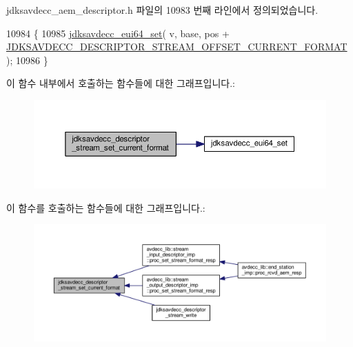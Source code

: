 jdksavdecc\+\_\+aem\+\_\+descriptor.\+h 파일의 10983 번째 라인에서 정의되었습니다.


\begin{DoxyCode}
10984 \{
10985     \hyperlink{group__eui64_ga1c5b342315464ff77cbc7d587765432d}{jdksavdecc\_eui64\_set}( v, base, pos + 
      \hyperlink{group__descriptor__stream_ga7a5a95301a026cee8fb77bf0f575e93f}{JDKSAVDECC\_DESCRIPTOR\_STREAM\_OFFSET\_CURRENT\_FORMAT} );
10986 \}
\end{DoxyCode}


이 함수 내부에서 호출하는 함수들에 대한 그래프입니다.\+:
\nopagebreak
\begin{figure}[H]
\begin{center}
\leavevmode
\includegraphics[width=350pt]{group__descriptor__stream_ga548deb717063430826d2498e6329e06f_cgraph}
\end{center}
\end{figure}




이 함수를 호출하는 함수들에 대한 그래프입니다.\+:
\nopagebreak
\begin{figure}[H]
\begin{center}
\leavevmode
\includegraphics[width=350pt]{group__descriptor__stream_ga548deb717063430826d2498e6329e06f_icgraph}
\end{center}
\end{figure}


